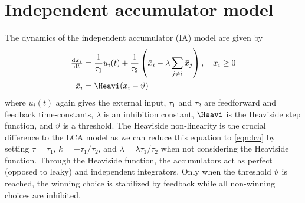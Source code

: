 \section{Independent accumulator model}\label{sec:ia}
The dynamics of the independent accumulator (IA) model are given by
\begin{align}
    \od{x_i}{t} &= \frac{1}{\tau_1} u_i(t) + \frac{1}{\tau_2} \del{\bar{x}_i - \bar{\lambda} \sum_{j \neq i} \bar{x}_j}, \quad x_i \geq 0 \\
    \bar{x}_i &= \Heavi(x_i - \vartheta)
\end{align}
where $u_i(t)$ again gives the external input, $\tau_1$ and $\tau_2$ are feedforward and feedback time-constants, $\bar{\lambda}$ is an inhibition constant, $\Heavi$ is the Heaviside step function, and $\vartheta$ is a threshold.
The Heaviside non-linearity is the crucial difference to the LCA model as we can reduce this equation to \cref{eqn:lca} by setting $\tau = \tau_1$, $k = -\tau_1/\tau_2$, and $\lambda = \bar{\lambda} \tau_1/\tau_2$ when not considering the Heaviside function.
Through the Heaviside function, the accumulators act as perfect (opposed to leaky) and independent integrators.
Only when the threshold $\vartheta$ is reached, the winning choice is stabilized by feedback while all non-winning choices are inhibited.


